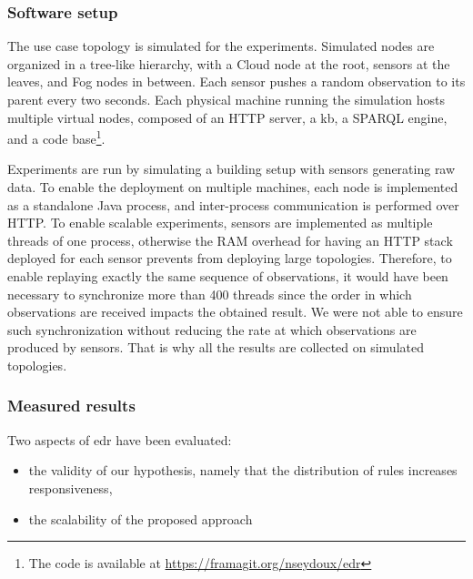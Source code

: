 \documentclass{iosart2c}
\begin{document}
\subsubsection{Software setup}

The use case topology is simulated for the experiments.
Simulated nodes are organized in a tree-like hierarchy, with a Cloud node at the root, sensors at the leaves, and Fog nodes in between.
Each sensor pushes a random observation to its parent every two seconds.
Each physical machine running the simulation hosts multiple virtual nodes, composed of an HTTP server, a \gls{kb}, a SPARQL engine, and a code base\footnote{The code is available at \url{https://framagit.org/nseydoux/edr}}.

Experiments are run by simulating a building setup with sensors generating raw data. 
To enable the deployment on multiple machines, each node is implemented as a standalone Java process, and inter-process communication is performed over HTTP. 
To enable scalable experiments, sensors are implemented as multiple threads of one process, otherwise the RAM overhead for having an HTTP stack deployed for each sensor prevents from deploying large topologies.
Therefore, to enable replaying exactly the same sequence of observations, it would have been necessary to synchronize more than 400 threads since the order in which observations are received impacts the obtained result. 
We were not able to ensure such synchronization without reducing the rate at which observations are produced by sensors.
That is why all the results are collected on simulated topologies.

\subsubsection{Measured results}

Two aspects of \gls{edr} have been evaluated:
\begin{itemize}
	\item the validity of our hypothesis, namely that the distribution of rules increases responsiveness,
	\item the scalability of the proposed approach
\end{itemize} 
\end{document}
